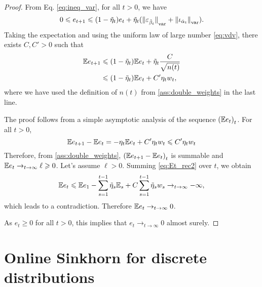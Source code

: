 \begin{proof}
From Eq. \eqref{eq:ineq_var}, for all $t > 0$, we have
\begin{equation}\label{eq:Et_rec}
    0 \leqslant e_{t+1} \leqslant 
    (1 - \tilde \eta_t) e_t
    + \tilde \eta_t
    ({\Vert \varepsilon_{\hat \beta_t} \Vert}_{\text{\upshape var}} + 
    {\Vert \iota_{\hat \alpha_t} \Vert}_{\text{\upshape var}}).
\end{equation}
Taking the expectation and using the uniform law of 
large number \eqref{eq:vdv}, there exists $C, C' > 0$ such that
\begin{align}
    \mathbb{E} e_{t+1} &\leqslant (1 - \tilde \eta_t) \mathbb{E} e_t + \tilde \eta_t \frac{C}{\sqrt{n(t)}} \\
    &\leqslant (1 - \tilde \eta_t) \mathbb{E} e_t + C' \eta_t w_t,
\end{align}
where we have used the definition of $n(t)$ from \autoref{ass:double_weights} in the last line.

The proof follows from a simple asymptotic analysis of the sequence ${(\mathbb{E} e_t)}_t$.
For all $t > 0$, 
\begin{equation}\label{eq:Et_rec2}
    \mathbb{E} e_{t+1} - \mathbb{E} e_t = - \eta_t \mathbb{E} e_t + C' \eta_t w_t \leqslant C' \eta_t w_t
\end{equation}
Therefore, from \autoref{ass:double_weights}, ${(\mathbb{E} e_{t+1} - \mathbb{E} e_t)}_t$ is
summable and $\mathbb{E} e_t \to_{t \to \infty} \ell \geqslant 0$. Let's assume $\ell > 0$.
Summing \eqref{eq:Et_rec2} over $t$, we obtain
\begin{equation}
    \mathbb{E} e_t \leqslant \mathbb{E} e_1 - \sum_{s=1}^{t-1} \tilde \eta_s \mathbb{E}_s 
    + C\sum_{s=1}^{t-1} \tilde \eta_s w_s \to_{t \to \infty} - \infty,
\end{equation}
which leads to a contradiction. Therefore $\mathbb{E} e_t \to_{t \to \infty} 0$. 

As
$e_t \geq 0$ for all $t > 0$, this implies that $e_t \to_{t \to \infty} 0$
almost surely.
\end{proof}

\section{Online Sinkhorn for discrete distributions}\label{sec:sinkhorn_discrete}


